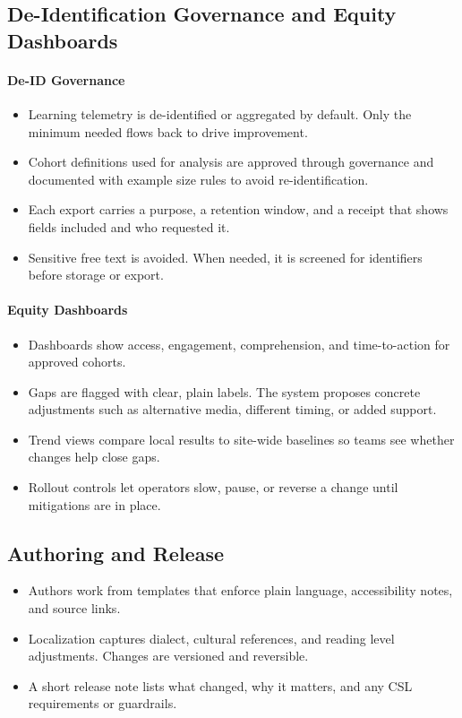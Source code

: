 \documentclass[12pt]{article}
\begin{document}
\subsection*{De-Identification Governance and Equity Dashboards}
\paragraph{De-ID Governance}
\begin{itemize}[leftmargin=*]
  \item Learning telemetry is de-identified or aggregated by default. Only the minimum needed flows back to drive improvement.
  \item Cohort definitions used for analysis are approved through governance and documented with example size rules to avoid re-identification.
  \item Each export carries a purpose, a retention window, and a receipt that shows fields included and who requested it.
  \item Sensitive free text is avoided. When needed, it is screened for identifiers before storage or export.
\end{itemize}

\paragraph{Equity Dashboards}
\begin{itemize}[leftmargin=*]
  \item Dashboards show access, engagement, comprehension, and time-to-action for approved cohorts.
  \item Gaps are flagged with clear, plain labels. The system proposes concrete adjustments such as alternative media, different timing, or added support.
  \item Trend views compare local results to site-wide baselines so teams see whether changes help close gaps.
  \item Rollout controls let operators slow, pause, or reverse a change until mitigations are in place.
\end{itemize}

\subsection*{Authoring and Release}
\begin{itemize}[leftmargin=*]
  \item Authors work from templates that enforce plain language, accessibility notes, and source links.
  \item Localization captures dialect, cultural references, and reading level adjustments. Changes are versioned and reversible.
  \item A short release note lists what changed, why it matters, and any CSL requirements or guardrails.
\end{itemize}
\end{document}
